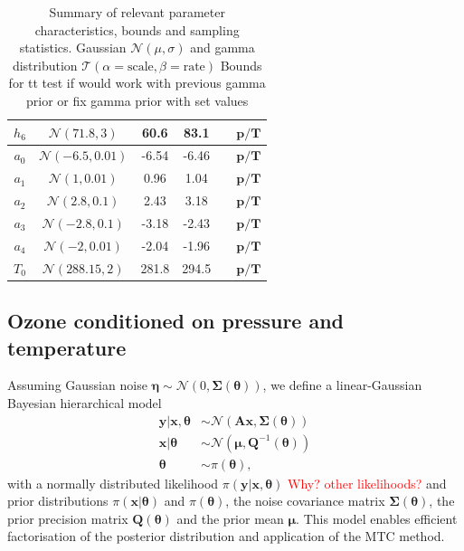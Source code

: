 \begin{table}
\begin{tabular}{ |c||c|c|c|c|c|   }
		$h_{6}$ &  $\mathcal{N}(71.8,3)$&60.6 &83.1&&$\bm{p/T}$\\ \hline
		$a_{0}$ &  $\mathcal{N}(-6.5,0.01)$&-6.54 &-6.46&&$\bm{p/T}$\\ \hline
		$a_{1}$ &  $\mathcal{N}(1,0.01)$&0.96 &1.04&&$\bm{p/T}$\\ \hline
		$a_{2}$ &  $\mathcal{N}(2.8,0.1)$&2.43 &3.18&&$\bm{p/T}$\\ \hline
		$a_{3}$ &  $\mathcal{N}(-2.8,0.1)$&-3.18 &-2.43&&$\bm{p/T}$\\ \hline
		$a_{4}$ & $\mathcal{N}(-2,0.01)$ &-2.04 &-1.96&&$\bm{p/T}$\\ \hline
		$T_{0}$ &  $\mathcal{N}(288.15,2)$& 281.8 &294.5&&$\bm{p/T}$\\
		\hline
	\end{tabular}
	\caption[Summary of relevant parameter characteristics, bounds and sampling statistics.]{Summary of relevant parameter characteristics, bounds and sampling statistics. Gaussian $\mathcal{N}(\mu,\sigma)$ and gamma distribution $\mathcal{T}(\alpha = \text{scale}, \beta = \text{rate})$
		Bounds for tt test if would work with previous gamma prior or fix gamma prior with set values}
	\label{tab:priors}
\end{table}

\subsection{Ozone conditioned on pressure and temperature}
Assuming Gaussian noise $\bm{\eta} \sim \mathcal{N}(0, \bm{\Sigma}(\bm{\theta}))$, we define a linear-Gaussian Bayesian hierarchical model~\cite{fox2016fast}
\begin{subequations}
	\begin{align}
		\bm{y} |  \bm{x}, \bm{\theta} &\sim \mathcal{N}(\bm{A} \bm{x}, \bm{\Sigma}(\bm{\theta})) \label{eq:likelihood} \\
		\bm{x} |  \bm{\theta} &\sim \mathcal{N}(\bm{\mu}, \bm{Q}^{-1}(\bm{\theta})) \label{eq:xPrior} \\
		\bm{\theta} &\sim \pi(\bm{\theta}) \label{eq:gammaPrior},
	\end{align}
	\label{eq:BayMode}
\end{subequations}
with a normally distributed likelihood $\pi(\bm{y} |  \bm{x}, \bm{\theta})$ \textcolor{red}{Why? other likelihoods?} and prior distributions $\pi(\bm{x} |  \bm{\theta})$ and $\pi(\bm{\theta})$, the noise covariance matrix $\bm{\Sigma}(\bm{\theta})$, the prior precision matrix $\bm{Q}(\bm{\theta})$ and the prior mean $\bm{\mu}$.
This model enables efficient factorisation of the posterior distribution and application of the MTC method.



